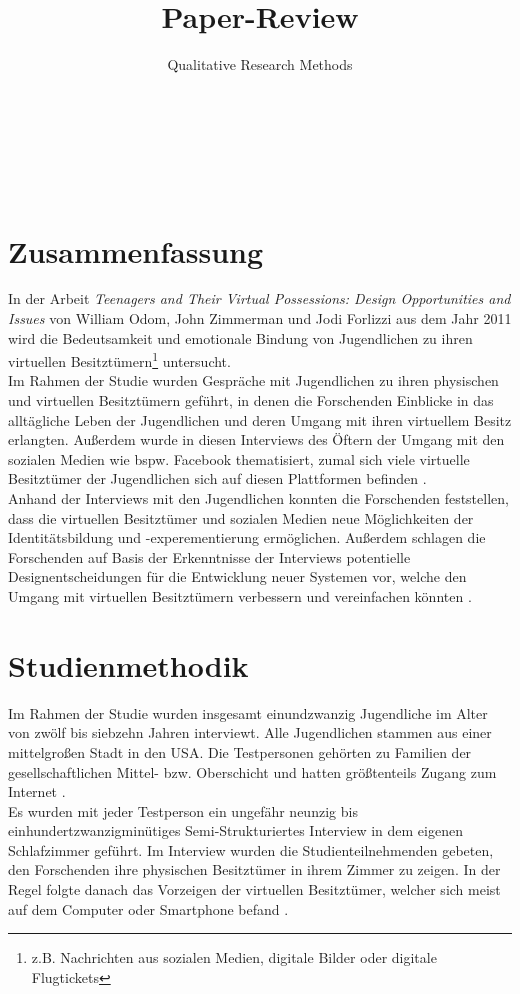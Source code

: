 \documentclass{hsflensburg}
\title{Paper-Review}
\subtitle{Qualitative Research Methods}
\author{
	\name{Tom Hartelt}\\
	\institution{Hochschule Flensburg}
	\and
	\name{Martin Hermannsen}\\
	\institution{Hochschule Flensburg}
	\and
	\name{Michael Frank}\\
	\institution{Hochschule Flensburg}
}
\begin{document}
	\maketitle
 	 \tableofcontents

  \pagebreak
	
	\section{Zusammenfassung}
	In der Arbeit \textit{Teenagers and Their Virtual Possessions: Design Opportunities and Issues} von
 	William Odom, John Zimmerman und Jodi Forlizzi aus dem Jahr 2011 wird die Bedeutsamkeit 
	und emotionale Bindung von Jugendlichen zu ihren virtuellen Besitztümern\footnote{ z.B. Nachrichten aus sozialen Medien, digitale Bilder oder digitale Flugtickets} untersucht.\\
	Im Rahmen der Studie wurden Gespräche mit  Jugendlichen zu ihren physischen und virtuellen Besitztümern 	geführt, in denen die Forschenden Einblicke in das alltägliche Leben der 
	Jugendlichen und deren Umgang mit ihren virtuellem Besitz erlangten. Außerdem wurde
	 in diesen Interviews des Öftern der Umgang mit den sozialen Medien wie bspw. Facebook thematisiert, zumal sich viele virtuelle Besitztümer der Jugendlichen sich auf diesen Plattformen befinden 
	\cite{odom2011teenagers}. \\

	Anhand der Interviews mit den Jugendlichen konnten die Forschenden feststellen, dass die 
	virtuellen Besitztümer und sozialen Medien neue Möglichkeiten der Identitätsbildung 
	und -experementierung ermöglichen. Außerdem schlagen die Forschenden auf Basis der 
	Erkenntnisse der Interviews potentielle Designentscheidungen für die 
	Entwicklung neuer Systemen vor, welche den Umgang mit virtuellen 
	Besitztümern verbessern und vereinfachen könnten \cite{odom2011teenagers}. 


	\section{Studienmethodik}
	Im Rahmen der Studie  wurden insgesamt einundzwanzig Jugendliche im Alter
	von zwölf bis siebzehn Jahren interviewt. Alle Jugendlichen stammen
	aus einer mittelgroßen Stadt in den USA. Die Testpersonen gehörten zu Familien
	der gesellschaftlichen Mittel- bzw. Oberschicht und hatten größtenteils Zugang 
	zum Internet \cite{odom2011teenagers}. \\

	Es wurden mit jeder Testperson ein ungefähr neunzig bis einhundertzwanzigminütiges
	Semi-Strukturiertes Interview in dem eigenen Schlafzimmer geführt. Im Interview
	wurden die Studienteilnehmenden gebeten, den Forschenden ihre physischen Besitztümer
	in ihrem Zimmer zu zeigen. In der Regel folgte danach das Vorzeigen der
	virtuellen Besitztümer, welcher sich meist auf dem Computer oder Smartphone befand 
	\cite{odom2011teenagers}. \\
\end{document}
